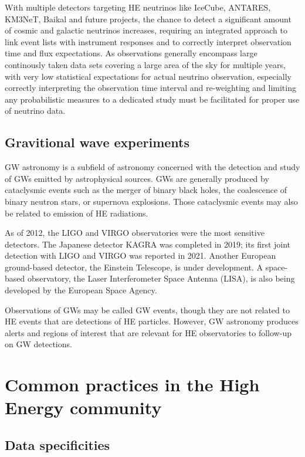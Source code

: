 \documentclass[11pt,a4paper]{ivoa}
\begin{document}
With multiple detectors targeting \gls{HE} neutrinos like IceCube, \gls{ANTARES}, \gls{KM3NeT}, Baikal and future projects, the
chance to detect a significant amount of cosmic and galactic neutrinos increases, requiring an integrated approach to
link event lists with instrument responses and to correctly interpret observation time and flux expectations. As observations
generally encompass large continously taken data sets covering a large area of the sky for multiple years, with very low statistical
expectations for actual neutrino observation, especially correctly interpreting the observation time interval and re-weighting and limiting any probabilistic
measures to a dedicated study must be facilitated for proper use of neutrino data.


\subsection{Gravitional wave experiments}

\Gls{GW} astronomy is a subfield of astronomy concerned with the detection and study of \gls{GW}s emitted by astrophysical sources. \gls{GW}s are generally  produced by cataclysmic events such as the merger of binary black holes, the coalescence of binary neutron stars, or supernova explosions. Those cataclysmic events may also be related to emission of \gls{HE} radiations.

As of 2012, the LIGO and VIRGO observatories were the most sensitive detectors. The Japanese detector KAGRA was completed in 2019; its first joint detection with LIGO and VIRGO was reported in 2021. Another European ground-based detector, the Einstein Telescope, is under development. A space-based observatory, the Laser Interferometer Space Antenna (LISA), is also being developed by the European Space Agency.

Observations of \gls{GW}s may be called \gls{GW} events, though they are not related to \gls{HE} events that are detections of \gls{HE} particles. However, \gls{GW} astronomy produces alerts and regions of interest that are relevant for \gls{HE} observatories to follow-up on \gls{GW} detections.



\section{Common practices in the High Energy community}
\label{sec:vhespec}

\subsection{Data specificities}
\end{document}
